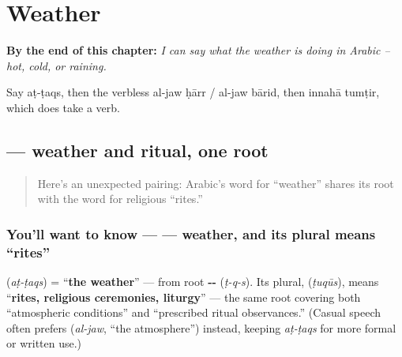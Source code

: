 
\chapter{Weather}
\label{ch:ar-weather}

\begin{chapteropening}
\textbf{By the end of this chapter:} \emph{I can say what the weather is doing in Arabic -- hot, cold, or raining.}

Say aṭ-ṭaqs, then the verbless al-jaw ḥārr / al-jaw bārid, then innahā tumṭir, which does take a verb.
\end{chapteropening}

\section[\texorpdfstring{\ar{الطقس} (aṭ-ṭaqs)}{الطقس (aṭ-ṭaqs)}]{ — weather and ritual, one root}

\label{lesson:AR-C18-al-taqs}



\begin{quote}
Here's an unexpected pairing: Arabic's word for \textquotedblleft{}weather\textquotedblright{} shares its root with the word for religious \textquotedblleft{}rites.\textquotedblright{}
\end{quote}

\subsection*{You'll want to know —  — weather, and its plural means \textquotedblleft{}rites\textquotedblright{}}
\textbf{} (\emph{aṭ-ṭaqs}) = \textquotedblleft{}\textbf{the weather}\textquotedblright{} — from root \textbf{--} (\emph{ṭ-q-s}). Its plural, \textbf{} (\emph{ṭuqūs}), means \textquotedblleft{}\textbf{rites, religious ceremonies, liturgy}\textquotedblright{} — the same root covering both \textquotedblleft{}atmospheric conditions\textquotedblright{} and \textquotedblleft{}prescribed ritual observances.\textquotedblright{} (Casual speech often prefers \textbf{} (\emph{al-jaw}, \textquotedblleft{}the atmosphere\textquotedblright{}) instead, keeping \emph{aṭ-ṭaqs} for more formal or written use.)

